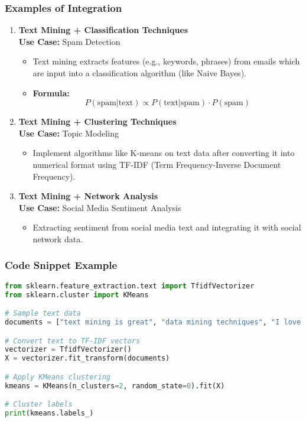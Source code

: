 \documentclass[aspectratio=169]{beamer}
\begin{document}
\begin{frame}[fragile]
    \frametitle{Examples of Integration}
    \begin{enumerate}
        \item \textbf{Text Mining + Classification Techniques}\\
            \textbf{Use Case:} Spam Detection
            \begin{itemize}
                \item Text mining extracts features (e.g., keywords, phrases) from emails which are input into a classification algorithm (like Naive Bayes). 
                \item \textbf{Formula:}
                \begin{equation}
                P(\text{spam} | \text{text}) \propto P(\text{text} | \text{spam}) \cdot P(\text{spam})
                \end{equation}
            \end{itemize}

        \item \textbf{Text Mining + Clustering Techniques}\\
            \textbf{Use Case:} Topic Modeling
            \begin{itemize}
                \item Implement algorithms like K-means on text data after converting it into numerical format using TF-IDF (Term Frequency-Inverse Document Frequency).
            \end{itemize}
        
        \item \textbf{Text Mining + Network Analysis}\\
            \textbf{Use Case:} Social Media Sentiment Analysis
            \begin{itemize}
                \item Extracting sentiment from social media text and integrating it with social network data.
            \end{itemize}
    \end{enumerate}
\end{frame}

\begin{frame}[fragile]
    \frametitle{Code Snippet Example}
    \begin{lstlisting}[language=Python]
from sklearn.feature_extraction.text import TfidfVectorizer
from sklearn.cluster import KMeans

# Sample text data
documents = ["text mining is great", "data mining techniques", "I love learning about text"]

# Convert text to TF-IDF vectors
vectorizer = TfidfVectorizer()
X = vectorizer.fit_transform(documents)

# Apply KMeans clustering
kmeans = KMeans(n_clusters=2, random_state=0).fit(X)

# Cluster labels
print(kmeans.labels_)
    \end{lstlisting}
\end{frame}
\end{document}
